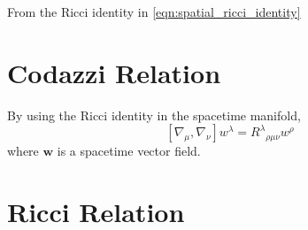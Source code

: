 From the Ricci identity in \cref{eqn:spatial_ricci_identity}



\section{Codazzi Relation}
\label{app:codazzi}


By using the Ricci identity in the spacetime manifold,
\begin{equation}
    \left[\nabla_\mu,\nabla_\nu\right]w^\lambda=R^\lambda{}_{\rho\mu\nu}w^\rho
\end{equation} 
where $\mathbf{w}$ is a spacetime vector field.




\section{Ricci Relation}
\label{app:ricci}



